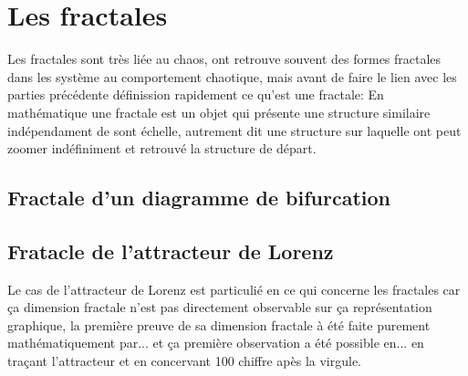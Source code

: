 \chapter{Les fractales}
\label{chapter:fractales}
Les fractales sont très liée au chaos, ont retrouve souvent des formes fractales dans les système au comportement chaotique, mais avant de faire le lien avec les parties précédente définission rapidement ce qu'est une fractale: En mathématique une fractale est un objet qui présente une structure similaire indépendament de sont échelle, autrement dit une structure sur laquelle ont peut zoomer indéfiniment et retrouvé la structure de départ.

\section{Fractale d'un diagramme de bifurcation}

\section{Fratacle de l'attracteur de Lorenz}
Le cas de l'attracteur de Lorenz est particulié en ce qui concerne les fractales car ça dimension fractale n'est pas directement observable sur ça représentation graphique, la première preuve de sa dimension fractale à été faite purement mathématiquement par... et ça première observation a été possible en... en traçant l'attracteur et en concervant 100 chiffre apès la virgule.